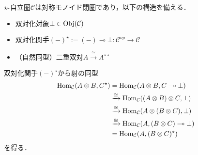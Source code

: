 \documentclass[type_judgement.tex]{subfiles}
\begin{document}

\begin{defn}
\label{def:star-auto}
$\star\mathchar`-$自立圏$\mathcal{C}$は対称モノイド閉圏であり，以下の構造を備える．
\begin{itemize}
    \item 双対化対象$\bot\in\mathop{\mathrm{Obj}}\nolimits(\mathcal{C})$
    \item 双対化関手$(-)^\star:=(-)\multimap \bot:\mathcal{C}^{op} \rightarrow \mathcal{C}$
    \item （自然同型）二重双対$A \xrightarrow{\cong} A^{\star\star}$
\end{itemize}
\end{defn}

双対化関手$(-)^\star$から射の同型
\begin{align*}
    \mathop{\mathrm{Hom}}\nolimits_\mathcal{C}(A \otimes B, C^\star) &= \mathop{\mathrm{Hom}}\nolimits_\mathcal{C}(A \otimes B, C \multimap \bot) \\
    &\xrightarrow{\cong} \mathop{\mathrm{Hom}}\nolimits_\mathcal{C}((A \otimes B) \otimes C, \bot) \\
    &\xrightarrow{\cong} \mathop{\mathrm{Hom}}\nolimits_\mathcal{C}(A \otimes (B \otimes C),  \bot) \\
    &\xrightarrow{\cong} \mathop{\mathrm{Hom}}\nolimits_\mathcal{C}(A, (B \otimes C) \multimap \bot) \\
    &= \mathop{\mathrm{Hom}}\nolimits_\mathcal{C}(A, (B \otimes C)^\star)
\end{align*}
を得る．
\end{document}
